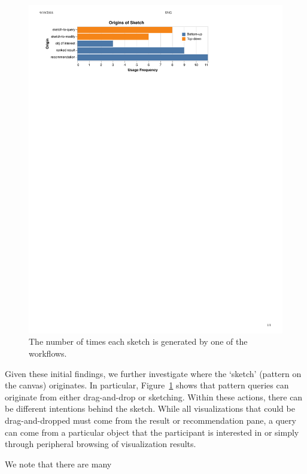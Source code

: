 \begin{figure}[h!]
  \includegraphics[width=\linewidth]{figures/the_origins_of_sketch.pdf}
  \caption{The number of times each sketch is generated by one of the workflows.}\label{fig:origins_of_sketch}
\end{figure}
\par Given these initial findings, we further investigate where the `sketch' (pattern on the canvas) originates. In particular, Figure~\ref{fig:origins_of_sketch} shows that pattern queries can originate from either drag-and-drop or sketching. Within these actions, there can be different intentions behind the sketch. While all visualizations that could be drag-and-dropped must come from the result or recommendation pane, a query can come from a particular object that the participant is interested in or simply through peripheral browsing of visualization results.%
\par We note that there are many %
